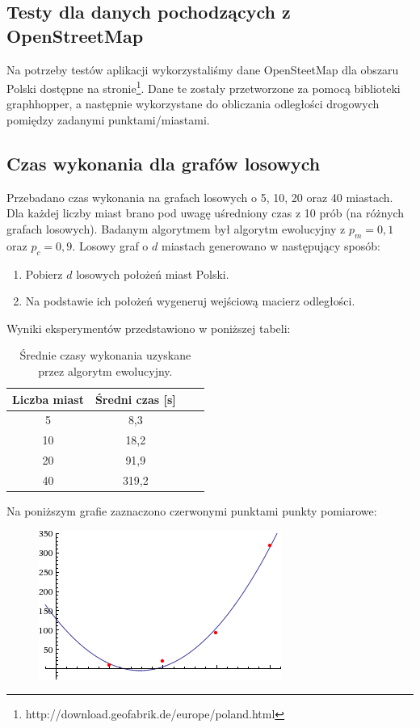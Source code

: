 \documentclass[12pt, a4paper]{article}
\begin{document}
\subsection{Testy dla danych pochodzących z OpenStreetMap}
Na potrzeby testów aplikacji wykorzystaliśmy dane OpenSteetMap dla obszaru Polski dostępne na stronie\footnote{{http://download.geofabrik.de/europe/poland.html}}. Dane te zostały przetworzone za pomocą biblioteki graphhopper, a następnie wykorzystane do obliczania odległości drogowych pomiędzy zadanymi punktami/miastami. 

\subsection{Czas wykonania dla grafów losowych}

Przebadano czas wykonania na grafach losowych o 5, 10, 20 oraz 40 miastach.
Dla każdej liczby miast brano pod uwagę uśredniony czas z 10 prób (na różnych grafach losowych).
Badanym algorytmem był algorytm ewolucyjny z $p_m=0,1$ oraz $p_c=0,9$.
Losowy graf o $d$ miastach generowano w następujący sposób:

\begin{enumerate}
 \item Pobierz $d$ losowych położeń miast Polski.
 \item Na podstawie ich położeń wygeneruj wejściową macierz odległości.
\end{enumerate}

Wyniki eksperymentów przedstawiono w poniższej tabeli:

\begin{table}[h]
\centering
	\begin{tabular}{ | c | c | c | c | } 
		\hline
  		Liczba miast & Średni czas [s] \\
  		\hline
  		5 & 8,3 \\
  		\hline
  		10 & 18,2 \\
  		\hline
  		20 & 91,9 \\
  		\hline
  		40 & 319,2 \\
  		\hline
	\end{tabular}
\caption{Średnie czasy wykonania uzyskane przez algorytm ewolucyjny.}
\end{table}

Na poniższym grafie zaznaczono czerwonymi punktami punkty pomiarowe:

\begin{figure}[H]
\centering
  \includegraphics[width=.5\textwidth]{time.png}
\end{figure}
\end{document}
